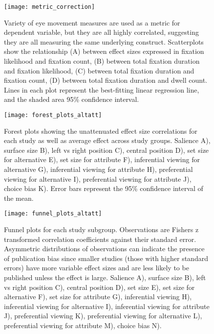 \documentclass{article}
\begin{document}

\clearpage


\begin{figure}%
\texttt{[image: metric\_correction]}
\centering
\caption{Variety of eye movement measures are used as a metric for dependent variable, but they are all highly correlated, suggesting they are all measuring the same underlying construct. Scatterplots show the relationship (A) between effect sizes expressed in fixation likelihood and fixation count, (B) between total fixation duration and fixation likelihood, (C) between total fixation duration and fixation count, (D) between total fixation duration and dwell count. Lines in each plot represent the best-fitting linear regression line, and the shaded area 95\% confidence interval.}
\label{fig:metric_correction}
\end{figure}
\clearpage



\clearpage



\clearpage


\begin{figure}%
\texttt{[image: forest\_plots\_altatt]}
\centering
\caption{Forest plots showing the unattenuated effect size correlations for each study as well as average effect across study groups. Salience A), surface size B), left vs right position C), central position D), set size for alternative E), set size for attribute F), inferential viewing for alternative G), inferential viewing for attribute H), preferential viewing for alternative I), preferential viewing for attribute J), choice bias K). Error bars represent the 95\% confidence interval of the mean.}
\label{fig:forest_plots_altatt}
\end{figure}
\clearpage


\begin{figure}%
\texttt{[image: funnel\_plots\_altatt]}
\centering
\caption{Funnel plots for each study subgroup. Observations are Fishers z transformed correlation coefficients against their standard error. Asymmetric distributions of observations can indicate the presence of publication bias since smaller studies (those with higher standard errors) have more variable effect sizes and are less likely to be published unless the effect is large. Salience A), surface size B), left vs right position C), central position D), set size E), set size for alternative F), set size for attribute G), inferential viewing H), inferential viewing for alternative I), inferential viewing for attribute J), preferential viewing K), preferential viewing for alternative L), preferential viewing for attribute M), choice bias N).}
\label{fig:funnel_plots_altatt}
\end{figure}
\clearpage
\end{document}
